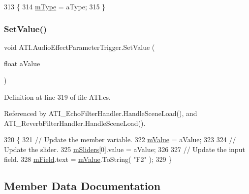 \begin{DoxyCode}
313         \{
314             \hyperlink{class_a_t_i_1_1_audio_effect_parameter_trigger_ac2ca110ecb26468c2c9fde094a1e5bd7}{mType} = aType;
315         \}
\end{DoxyCode}
\mbox{\label{class_a_t_i_1_1_audio_effect_parameter_trigger_a07ec3a40faeed18c0d85abb035270292}} 
\subsubsection{\texorpdfstring{Set\+Value()}{SetValue()}}
{\footnotesize\ttfamily void A\+T\+I.\+Audio\+Effect\+Parameter\+Trigger.\+Set\+Value (\begin{DoxyParamCaption}\item[{float}]{a\+Value }\end{DoxyParamCaption})}



Definition at line 319 of file A\+T\+I.\+cs.



Referenced by A\+T\+I\+\_\+\+Echo\+Filter\+Handler.\+Handle\+Scene\+Load(), and A\+T\+I\+\_\+\+Reverb\+Filter\+Handler.\+Handle\+Scene\+Load().


\begin{DoxyCode}
320         \{
321             \textcolor{comment}{// Update the member variable.}
322             \hyperlink{class_a_t_i_1_1_audio_effect_parameter_trigger_ad123c432e1decb6410707940ab7383e6}{mValue} = aValue;
323 
324             \textcolor{comment}{// Update the slider.}
325             \hyperlink{class_a_t_i_1_1_slider_handler_a038a487fbd701cb786e77c210830be76}{mSliders}[0].value = aValue;
326 
327             \textcolor{comment}{// Update the input field.}
328             \hyperlink{class_a_t_i_1_1_audio_effect_parameter_trigger_af2d8e3ab407c8e1eb216fd67976ac0c8}{mField}.text = \hyperlink{class_a_t_i_1_1_audio_effect_parameter_trigger_ad123c432e1decb6410707940ab7383e6}{mValue}.ToString( \textcolor{stringliteral}{"F2"} );
329         \}
\end{DoxyCode}


\subsection{Member Data Documentation}
\mbox{\label{class_a_t_i_1_1_audio_effect_parameter_trigger_af2d8e3ab407c8e1eb216fd67976ac0c8}} 
